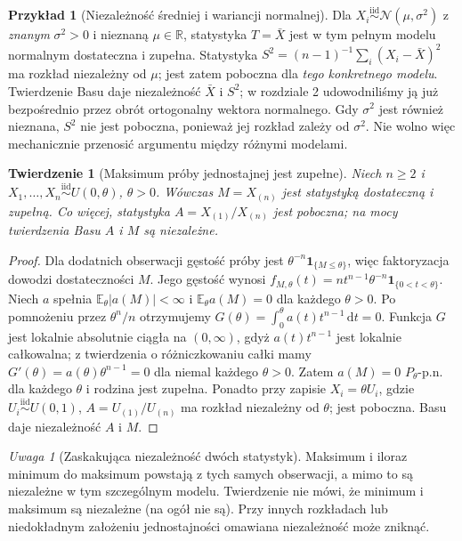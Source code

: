 \documentclass[11pt,a4paper,oneside]{report}
\numberwithin{equation}{chapter}
\theoremstyle{plain}
\newtheorem{twierdzenie}{Twierdzenie}[chapter]
\theoremstyle{definition}
\newtheorem{przyklad}{Przykład}[chapter]
\theoremstyle{remark}
\newtheorem{uwaga}{Uwaga}[chapter]
\newcommand{\R}{\mathbb R}
\newcommand{\E}{\mathbb E}
\newcommand{\ind}[1]{\mathbf 1_{#1}}
\newcommand{\dd}{\mathrm d}
\newcommand{\Normal}{\mathcal N}
\newcommand{\iid}{\mathrel{\overset{\mathrm{iid}}\sim}}
\begin{document}
\begin{przyklad}[Niezależność średniej i wariancji normalnej]
Dla $X_i\iid\Normal(\mu,\sigma^2)$ z \emph{znanym} $\sigma^2>0$
i nieznaną $\mu\in\R$, statystyka $T=\bar X$ jest
w tym pełnym modelu normalnym dostateczna i zupełna.
Statystyka $S^2=(n-1)^{-1}\sum_i(X_i-\bar X)^2$
ma rozkład niezależny od $\mu$; jest zatem poboczna dla
\emph{tego konkretnego modelu}. Twierdzenie Basu daje
niezależność $\bar X$ i $S^2$; w rozdziale 2 udowodniliśmy
ją już bezpośrednio przez obrót ortogonalny wektora normalnego.
Gdy $\sigma^2$ jest również nieznana, $S^2$ nie jest poboczna,
ponieważ jej rozkład zależy od $\sigma^2$. Nie wolno więc
mechanicznie przenosić argumentu między różnymi modelami.
\end{przyklad}


\begin{twierdzenie}[Maksimum próby jednostajnej jest zupełne]
\label{thm:uniform-complete}
Niech $n\ge2$ i $X_1,\ldots,X_n\iid U(0,\theta)$, $\theta>0$.
Wówczas $M=X_{(n)}$ jest statystyką dostateczną i zupełną.
Co więcej, statystyka $A=X_{(1)}/X_{(n)}$ jest poboczna;
na mocy twierdzenia Basu $A$ i $M$ są niezależne.
\end{twierdzenie}
\begin{proof}
Dla dodatnich obserwacji gęstość próby jest
$\theta^{-n}\ind{\{M\le\theta\}}$, więc faktoryzacja dowodzi
dostateczności $M$. Jego gęstość wynosi
$f_{M,\theta}(t)=n t^{n-1}\theta^{-n}\ind{\{0<t<\theta\}}$.
Niech $a$ spełnia $\E_\theta|a(M)|<\infty$ i
$\E_\theta a(M)=0$ dla każdego $\theta>0$.
Po pomnożeniu przez $\theta^n/n$ otrzymujemy
$G(\theta)=\int_0^\theta a(t)t^{n-1}\,\dd t=0$.
Funkcja $G$ jest lokalnie absolutnie ciągła na $(0,\infty)$,
gdyż $a(t)t^{n-1}$ jest lokalnie całkowalna; z twierdzenia
o różniczkowaniu całki mamy
$G'(\theta)=a(\theta)\theta^{n-1}=0$ dla niemal każdego
$\theta>0$. Zatem $a(M)=0$ $P_\theta$-p.n. dla każdego
$\theta$ i rodzina jest zupełna.
Ponadto przy zapisie $X_i=\theta U_i$, gdzie $U_i\iid U(0,1)$,
$A=U_{(1)}/U_{(n)}$ ma rozkład niezależny od $\theta$;
jest poboczna. Basu daje niezależność $A$ i $M$.
\end{proof}
\begin{uwaga}[Zaskakująca niezależność dwóch statystyk]
Maksimum i iloraz minimum do maksimum powstają z tych samych
obserwacji, a mimo to są niezależne w tym szczególnym modelu.
Twierdzenie nie mówi, że minimum i maksimum są niezależne
(na ogół nie są). Przy innych rozkładach lub niedokładnym
założeniu jednostajności omawiana niezależność może zniknąć.
\end{uwaga}
\end{document}
